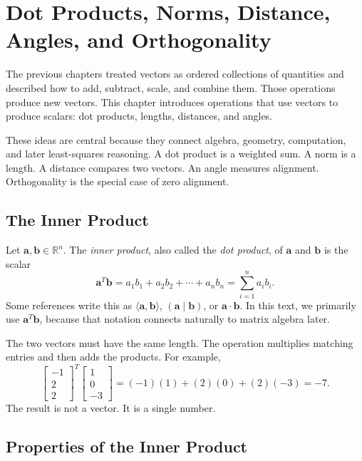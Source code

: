 \chapter{Dot Products, Norms, Distance, Angles, and Orthogonality}
\label{mf:ch05-dot-products-norms-distance-angles-orthogonality}

The previous chapters treated vectors as ordered collections of quantities and described how to add, subtract, scale, and combine them. Those operations produce new vectors. This chapter introduces operations that use vectors to produce scalars: dot products, lengths, distances, and angles.

These ideas are central because they connect algebra, geometry, computation, and later least-squares reasoning. A dot product is a weighted sum. A norm is a length. A distance compares two vectors. An angle measures alignment. Orthogonality is the special case of zero alignment.

\section{The Inner Product}
\label{mf:dot-product}

Let \(\mathbf{a},\mathbf{b}\in\mathbb{R}^n\). The \emph{inner product}, also called the \emph{dot product}, of \(\mathbf{a}\) and \(\mathbf{b}\) is the scalar
\[
    \mathbf{a}^T\mathbf{b}
    =a_1b_1+a_2b_2+\cdots+a_nb_n
    =\sum_{i=1}^n a_i b_i.
\]
Some references write this as \(\langle \mathbf{a},\mathbf{b}\rangle\), \((\mathbf{a}\mid\mathbf{b})\), or \(\mathbf{a}\cdot\mathbf{b}\). In this text, we primarily use \(\mathbf{a}^T\mathbf{b}\), because that notation connects naturally to matrix algebra later.

The two vectors must have the same length. The operation multiplies matching entries and then adds the products. For example,
\[
    \begin{bmatrix}-1\\2\\2\end{bmatrix}^T
    \begin{bmatrix}1\\0\\-3\end{bmatrix}
    =(-1)(1)+(2)(0)+(2)(-3)=-7.
\]
The result is not a vector. It is a single number.

\section{Properties of the Inner Product}
\label{mf:dot-product-properties}

